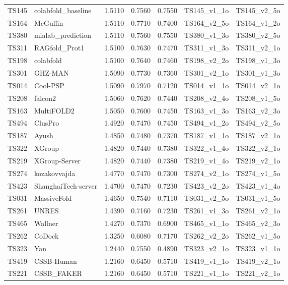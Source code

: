 \begin{table}[ht]
{\begin{tabular}{llrrrll}
TS145 & colabfold\_baseline & 1.5110 & 0.7560 & 0.7550 & TS145\_v1\_1o & TS145\_v2\_5o \\ 
TS164 & McGuffin & 1.5110 & 0.7710 & 0.7400 & TS164\_v2\_5o & TS164\_v1\_2o \\ 
TS380 & mialab\_prediction & 1.5110 & 0.7560 & 0.7550 & TS380\_v1\_3o & TS380\_v2\_5o \\ 
TS311 & RAGfold\_Prot1 & 1.5100 & 0.7630 & 0.7470 & TS311\_v1\_3o & TS311\_v2\_1o \\ 
TS198 & colabfold & 1.5100 & 0.7640 & 0.7460 & TS198\_v2\_2o & TS198\_v1\_3o \\ 
TS301 & GHZ-MAN & 1.5090 & 0.7730 & 0.7360 & TS301\_v2\_1o & TS301\_v1\_3o \\ 
TS014 & Cool-PSP & 1.5090 & 0.7970 & 0.7120 & TS014\_v1\_1o & TS014\_v2\_1o \\ 
TS208 & falcon2 & 1.5060 & 0.7620 & 0.7440 & TS208\_v2\_4o & TS208\_v1\_5o \\ 
TS163 & MultiFOLD2 & 1.5050 & 0.7600 & 0.7450 & TS163\_v1\_3o & TS163\_v2\_3o \\ 
TS494 & ClusPro & 1.4920 & 0.7470 & 0.7450 & TS494\_v1\_2o & TS494\_v2\_5o \\ 
TS187 & Ayush & 1.4850 & 0.7480 & 0.7370 & TS187\_v1\_1o & TS187\_v2\_1o \\ 
TS322 & XGroup & 1.4820 & 0.7440 & 0.7380 & TS322\_v1\_4o & TS322\_v2\_1o \\ 
TS219 & XGroup-Server & 1.4820 & 0.7440 & 0.7380 & TS219\_v1\_4o & TS219\_v2\_1o \\ 
TS274 & kozakovvajda & 1.4770 & 0.7470 & 0.7300 & TS274\_v2\_1o & TS274\_v1\_5o \\ 
TS423 & ShanghaiTech-server & 1.4700 & 0.7470 & 0.7230 & TS423\_v2\_2o & TS423\_v1\_4o \\ 
TS031 & MassiveFold & 1.4650 & 0.7540 & 0.7110 & TS031\_v2\_5o & TS031\_v1\_5o \\ 
TS261 & UNRES & 1.4390 & 0.7160 & 0.7230 & TS261\_v1\_3o & TS261\_v2\_1o \\ 
TS465 & Wallner & 1.4270 & 0.7370 & 0.6900 & TS465\_v1\_1o & TS465\_v2\_3o \\ 
TS262 & CoDock & 1.3250 & 0.6080 & 0.7170 & TS262\_v2\_2o & TS262\_v1\_5o \\ 
TS323 & Yan & 1.2440 & 0.7550 & 0.4890 & TS323\_v2\_1o & TS323\_v1\_1o \\ 
TS419 & CSSB-Human & 1.2160 & 0.6450 & 0.5710 & TS419\_v1\_1o & TS419\_v2\_1o \\ 
TS221 & CSSB\_FAKER & 1.2160 & 0.6450 & 0.5710 & TS221\_v1\_1o & TS221\_v2\_1o \\ 

\end{tabular}}
\end{table}
